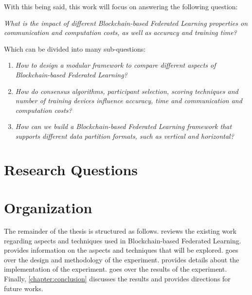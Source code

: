 With this being said, this work will focus on answering the following question:

\begin{center}
    \textit{What is the impact of different Blockchain-based Federated Learning properties on communication and computation costs, as well as accuracy and training time?}
\end{center}

Which can be divided into many sub-questions:

\begin{enumerate}
    \item \textit{How to design a modular framework to compare different aspects of Blockchain-based Federated Learning?}
    
    \item \textit{How do consensus algorithms, participant selection, scoring techniques and number of training devices influence accuracy, time and communication and computation costs?}
    
    \item \textit{How can we build a Blockchain-based Federated Learning framework that supports different data partition formats, such as vertical and horizontal?}
\end{enumerate}

\section{Research Questions}

\todo{}

\section{Organization}

The remainder of the thesis is structured as follows.  reviews the existing work regarding aspects and techniques used in Blockchain-based Federated Learning.  provides information on the aspects and techniques that will be explored.  goes over the design and methodology of the experiment.  provides details about the implementation of the experiment.  goes over the results of the experiment. Finally, \cref{chapter:conclusion} discusses the results and provides directions for future works.

